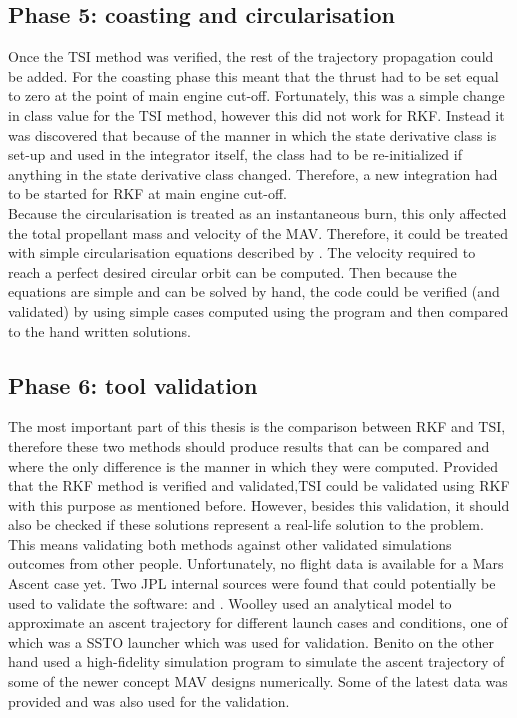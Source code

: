\subsection{Phase 5: coasting and circularisation}
\label{subsec:phase5com}
Once the \ac{TSI} method was verified, the rest of the trajectory propagation could be added. For the coasting phase this meant that the thrust had to be set equal to zero at the point of main engine cut-off. Fortunately, this was a simple change in class value for the \ac{TSI} method, however this did not work for \ac{RKF}. Instead it was discovered that because of the manner in which the state derivative class is set-up and used in the integrator itself, the class had to be re-initialized if anything in the state derivative class changed. Therefore, a new integration had to be started for \ac{RKF} at main engine cut-off. \\

Because the circularisation is treated as an instantaneous burn, this only affected the total propellant mass and velocity of the \ac{MAV}. Therefore, it could be treated with simple circularisation equations described by \cite{wakker2010}. The velocity required to reach a perfect desired circular orbit can be computed. Then because the equations are simple and can be solved by hand, the code could be verified (and validated) by using simple cases computed using the program and then compared to the hand written solutions. 

\subsection{Phase 6: tool validation}
\label{subsec:phase6com}
The most important part of this thesis is the comparison between \ac{RKF} and \ac{TSI}, therefore these two methods should produce results that can be compared and where the only difference is the manner in which they were computed. Provided that the \ac{RKF} method is verified and validated,\ac{TSI} could be validated using \ac{RKF} with this purpose as mentioned before. However, besides this validation, it should also be checked if these solutions represent a real-life solution to the problem. This means validating both methods against other validated simulations outcomes from other people. Unfortunately, no flight data is available for a Mars Ascent case yet. Two \ac{JPL} internal sources were found that could potentially be used to validate the software: \cite{woolley2015simple} and \cite{benito2016trajectory}. Woolley used an analytical model to approximate an ascent trajectory for different launch cases and conditions, one of which was a \ac{SSTO} launcher which was used for validation. Benito on the other hand used a high-fidelity simulation program to simulate the ascent trajectory of some of the newer concept \ac{MAV} designs numerically. Some of the latest data was provided and was also used for the validation.\\

